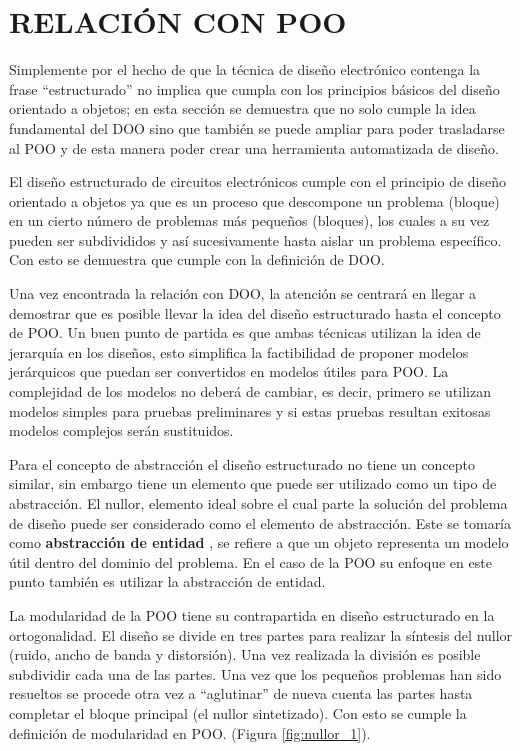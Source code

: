 \documentclass[10pt,twocolumn,twoside,letterpaper]{IEEEtran}
\begin{document}
{\section{\bf RELACI\'ON CON POO}
Simplemente por el hecho de que la t\'ecnica de dise\~no electr\'onico contenga la frase ``estructurado'' no implica que cumpla con los principios b\'asicos del dise\~no orientado a objetos; en esta secci\'on se demuestra que no solo cumple la idea fundamental del DOO sino que tambi\'en se puede ampliar para poder trasladarse al POO y de esta manera poder crear una herramienta automatizada de dise\~no.

El dise\~no estructurado de circuitos electr\'onicos cumple con el principio de dise\~no o\-rien\-ta\-do a objetos ya que es un proceso que des\-com\-po\-ne un problema (bloque) en un cierto n\'umero de problemas m\'as peque\~nos (bloques), los cuales a su vez pueden ser subdivididos y as\'i sucesivamente hasta aislar un problema espec\'ifico. Con esto se demuestra que cumple con la definici\'on de DOO.

Una vez encontrada la relaci\'on con DOO, la atenci\'on se centrar\'a en llegar a demostrar que es posible llevar la idea del dise\~no estructurado hasta el concepto de POO. Un buen punto de partida es que ambas t\'ecnicas utilizan la idea de jerarqu\'ia en los dise\~nos, esto simplifica la factibilidad de proponer modelos jer\'arquicos que puedan ser convertidos en modelos \'utiles para POO. La complejidad de los modelos no deber\'a de cambiar, es decir, primero se utilizan modelos simples para pruebas preliminares y si estas pruebas resultan exitosas modelos complejos ser\'an sustituidos.

Para el concepto de abstracci\'on el dise\~no estructurado no tiene un concepto similar, sin embargo tiene un elemento que puede ser utilizado como un tipo de abstracci\'on. El nullor, elemento ideal sobre el cual parte la soluci\'on del pro\-ble\-ma de dise\~no puede ser considerado como el elemento de abstracci\'on. Este se tomar\'ia como {\bf abstracci\'on de entidad} \cite{booch}, se refiere a que un objeto representa un modelo \'util dentro del dominio del problema. En el caso de la POO su enfoque en este punto tambi\'en es utilizar la abstracci\'on de entidad.

La modularidad de la POO tiene su contrapartida en dise\~no estructurado en la or\-to\-go\-na\-li\-dad. El dise\~no se divide en tres partes para rea\-li\-zar la s\'intesis del nullor (ruido, ancho de banda y distorsi\'on). Una vez realizada la divisi\'on es posible subdividir cada una de las partes. Una vez que los peque\~nos problemas han \mbox{sido} resueltos se procede otra vez a ``aglutinar'' de nueva cuenta las partes hasta completar el bloque principal (el nullor sintetizado). Con \mbox{esto} se cumple la definici\'on de modularidad en POO. (Figura \ref{fig:nullor_1}). 

}
\end{document}
